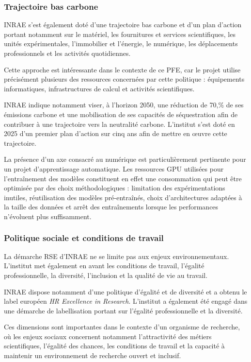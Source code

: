 \documentclass[12pt,a4paper,twoside]{article}
\begin{document}
\subsubsection{Trajectoire bas carbone}

INRAE s'est également doté d'une trajectoire bas carbone et d'un plan d'action portant notamment sur le matériel, les fournitures et services scientifiques, les unités expérimentales, l'immobilier et l'énergie, le numérique, les déplacements professionnels et les activités quotidiennes.

Cette approche est intéressante dans le contexte de ce PFE, car le projet utilise précisément plusieurs des ressources concernées par cette politique : équipements informatiques, infrastructures de calcul et activités scientifiques.

INRAE indique notamment viser, à l'horizon 2050, une réduction de 70,\% de ses émissions carbone et une mobilisation de ses capacités de séquestration afin de contribuer à une trajectoire vers la neutralité carbone. L'institut s'est doté en 2025 d'un premier plan d'action sur cinq ans afin de mettre en œuvre cette trajectoire.

La présence d'un axe consacré au numérique est particulièrement pertinente pour un projet d'apprentissage automatique. Les ressources GPU utilisées pour l'entraînement des modèles constituent en effet une consommation qui peut être optimisée par des choix méthodologiques : limitation des expérimentations inutiles, réutilisation des modèles pré-entraînés, choix d'architectures adaptées à la taille des données et arrêt des entraînements lorsque les performances n'évoluent plus suffisamment.

\subsubsection{Politique sociale et conditions de travail}

La démarche RSE d'INRAE ne se limite pas aux enjeux environnementaux. L'institut met également en avant les conditions de travail, l'égalité professionnelle, la diversité, l'inclusion et la qualité de vie au travail.

INRAE dispose notamment d'une politique d'égalité et de diversité et a obtenu le label européen \textit{HR Excellence in Research}. L'institut a également été engagé dans une démarche de labellisation portant sur l'égalité professionnelle et la diversité.

Ces dimensions sont importantes dans le contexte d'un organisme de recherche, où les enjeux sociaux concernent notamment l'attractivité des métiers scientifiques, l'égalité des chances, les conditions de travail et la capacité à maintenir un environnement de recherche ouvert et inclusif.
\end{document}
